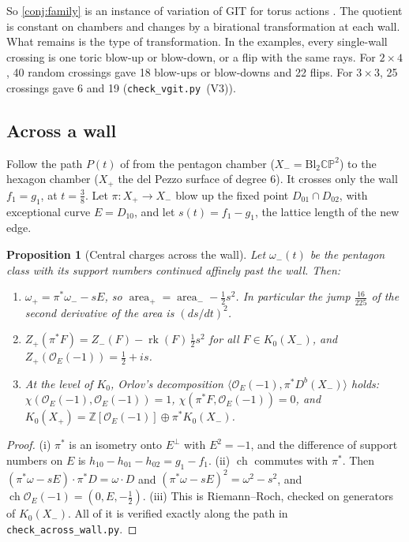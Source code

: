 \documentclass[11pt]{article}
\newtheorem{proposition}[theorem]{Proposition}
\theoremstyle{definition}
\theoremstyle{remark}
\begin{document}
So \cref{conj:family} is an instance of variation of GIT for torus actions \cite{Thaddeus1996,DolgachevHu1998}. The
quotient is constant on chambers and changes by a birational transformation at each wall. What remains is the type of
transformation. In the examples, every single-wall crossing is one toric blow-up or blow-down, or a flip with the same rays.
For $2\times4$, 40 random crossings gave 18 blow-ups or blow-downs and 22 flips. For $3\times3$, 25 crossings gave 6 and 19
(\texttt{check\_vgit.py}~(V3)).

\subsection{Across a wall}\label{sec:acrosswall}

Follow the path $P(t)$ of \cite[\S12]{Awasthi-Family} from the pentagon chamber ($X_-=\mathrm{Bl}_2\mathbb{CP}^2$) to the hexagon
chamber ($X_+$ the del Pezzo surface of degree 6). It crosses only the wall $f_1=g_1$, at $t=\frac38$. Let
$\pi\colon X_+\to X_-$ blow up the fixed point $D_{01}\cap D_{02}$, with exceptional curve $E=D_{10}$, and let
$s(t)=f_1-g_1$, the lattice length of the new edge.

\begin{proposition}[Central charges across the wall]\label{prop:acrosswall}
Let $\omega_-(t)$ be the pentagon class with its support numbers continued affinely past the wall. Then:
\begin{enumerate}[label=(\roman*)]
\item $\omega_+=\pi^*\omega_--sE$, so $\operatorname{area}_+=\operatorname{area}_--\tfrac12s^2$. In particular the jump $\frac{16}{225}$ of the second
  derivative of the area \cite[\S12]{Awasthi-Family} is $(ds/dt)^2$.
\item $Z_+(\pi^*F)=Z_-(F)-\operatorname{rk}(F)\,\tfrac12s^2$ for all $F\in K_0(X_-)$, and $Z_+(\mathcal O_E(-1))=\tfrac12+is$.
\item At the level of $K_0$, Orlov's decomposition $\langle\mathcal O_E(-1),\pi^*D^b(X_-)\rangle$ holds:
  $\chi(\mathcal O_E(-1),\mathcal O_E(-1))=1$, $\chi(\pi^*F,\mathcal O_E(-1))=0$, and $K_0(X_+)=\mathbb Z[\mathcal O_E(-1)]\oplus\pi^*K_0(X_-)$.
\end{enumerate}
\end{proposition}
\begin{proof}
(i) $\pi^*$ is an isometry onto $E^\perp$ with $E^2=-1$, and the difference of support numbers on $E$ is
$h_{10}-h_{01}-h_{02}=g_1-f_1$. (ii) $\operatorname{ch}$ commutes with $\pi^*$. Then
$(\pi^*\omega-sE)\cdot\pi^*D=\omega\cdot D$ and $(\pi^*\omega-sE)^2=\omega^2-s^2$, and $\operatorname{ch}\mathcal O_E(-1)=(0,E,-\frac12)$.
(iii) This is Riemann--Roch, checked on generators of $K_0(X_-)$. All of it is verified exactly along the path in
\texttt{check\_across\_wall.py}.
\end{proof}
\end{document}
